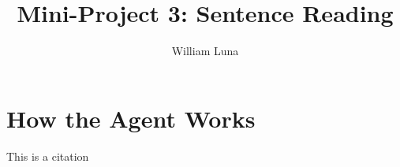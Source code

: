 \documentclass[
	letterpaper, %
]{jdf}
\author{William Luna}
\title{Mini-Project 3: Sentence Reading}
\begin{document}

\maketitle

\section{How the Agent Works}
This is a citation \cite{joyner2016}
\end{document}

